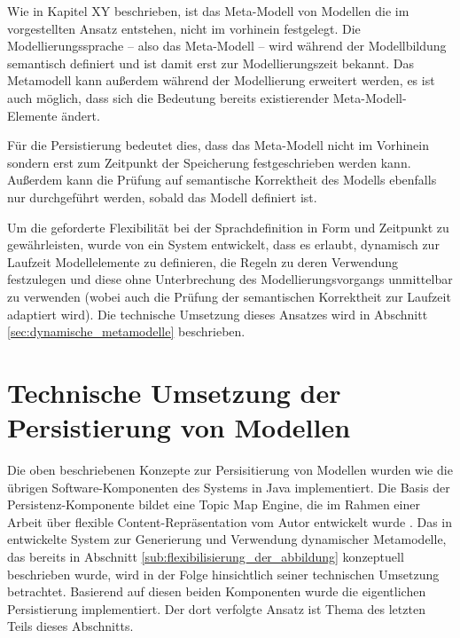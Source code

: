 Wie in Kapitel XY beschrieben, ist das Meta-Modell von Modellen die im vorgestellten Ansatz entstehen, nicht im vorhinein festgelegt. Die Modellierungssprache -- also das Meta-Modell -- wird während der Modellbildung semantisch definiert und ist damit erst zur Modellierungszeit bekannt. Das Metamodell kann außerdem während der Modellierung erweitert werden, es ist auch möglich, dass sich die Bedeutung bereits existierender Meta-Modell-Elemente ändert.

Für die Persistierung bedeutet dies, dass das Meta-Modell nicht im Vorhinein sondern erst zum Zeitpunkt der Speicherung festgeschrieben werden kann. Außerdem kann die Prüfung auf semantische Korrektheit des Modells ebenfalls nur durchgeführt werden, sobald das Modell definiert ist. 

Um die geforderte Flexibilität bei der Sprachdefinition in Form und Zeitpunkt zu gewährleisten, wurde von \citet{Neubauer08} ein System entwickelt, dass es erlaubt, dynamisch zur Laufzeit Modellelemente zu definieren, die Regeln zu deren Verwendung festzulegen und diese ohne Unterbrechung des Modellierungsvorgangs unmittelbar zu verwenden (wobei auch die Prüfung der semantischen Korrektheit zur Laufzeit adaptiert wird). Die technische Umsetzung dieses Ansatzes wird in Abschnitt \ref{sec:dynamische_metamodelle} beschrieben.



\section{Technische Umsetzung der Persistierung von Modellen} %
\label{sec:technische_umsetzung_der_persistierung_von_modellen}

Die oben beschriebenen Konzepte zur Persisitierung von Modellen wurden wie die übrigen Software-Komponenten des Systems in Java implementiert. Die Basis der Persistenz-Komponente bildet eine Topic Map Engine, die im Rahmen einer Arbeit über flexible Content-Repräsentation vom Autor entwickelt wurde \citep{Oppl07}. Das in \citep{Neubauer08} entwickelte System zur Generierung und Verwendung dynamischer Metamodelle, das bereits in Abschnitt \ref{sub:flexibilisierung_der_abbildung} konzeptuell beschrieben wurde, wird in der Folge hinsichtlich seiner technischen Umsetzung betrachtet. Basierend auf diesen beiden Komponenten wurde die eigentlichen Persistierung implementiert. Der dort verfolgte Ansatz ist Thema des letzten Teils dieses Abschnitts.

